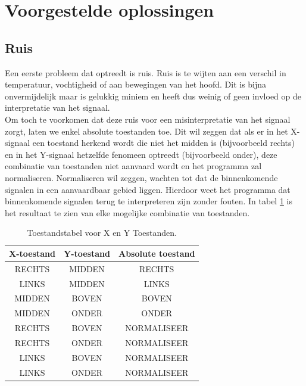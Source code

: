 \documentclass{article}
\begin{document}
\section{Voorgestelde oplossingen}
\subsection{Ruis}\label{sec:ruis}
Een eerste probleem dat optreedt is ruis. Ruis is te wijten aan een verschil in temperatuur, vochtigheid of aan bewegingen van het hoofd. Dit is bijna onvermijdelijk maar is gelukkig miniem en heeft dus weinig of geen invloed op de interpretatie van het signaal.\\

Om toch te voorkomen dat deze ruis voor een misinterpretatie van het signaal zorgt, laten we enkel absolute toestanden toe. Dit wil zeggen dat als er in het X-signaal een toestand herkend wordt die niet het midden is (bijvoorbeeld rechts) en in het Y-signaal hetzelfde fenomeen optreedt (bijvoorbeeld onder), deze combinatie van toestanden niet aanvaard wordt en het programma zal normaliseren. Normaliseren wil zeggen, wachten tot dat de binnenkomende signalen in een aanvaardbaar gebied liggen. Hierdoor weet het programma dat binnenkomende signalen terug te interpreteren zijn zonder fouten. In tabel \ref{tbl:toestandstabel} is het resultaat te zien van elke mogelijke combinatie van toestanden.
\begin{table}[H]
	\centering
	\vspace{0.5cm}
	\begin{tabular}{|c|c||c|}
		\hline \textbf{X-toestand} & \textbf{Y-toestand} & \textbf{Absolute toestand} \\ 
		\hline RECHTS & MIDDEN & RECHTS \\ 
		\hline LINKS & MIDDEN & LINKS \\ 
		\hline MIDDEN & BOVEN & BOVEN \\ 
		\hline MIDDEN & ONDER & ONDER \\ 
		\hline RECHTS & BOVEN & NORMALISEER \\ 
		\hline RECHTS & ONDER & NORMALISEER \\ 
		\hline LINKS & BOVEN & NORMALISEER \\ 
		\hline LINKS & ONDER & NORMALISEER \\ 
		\hline 
	\end{tabular}
	\caption{Toestandstabel voor X en Y Toestanden.}
	\label{tbl:toestandstabel}
\end{table}
\end{document}
